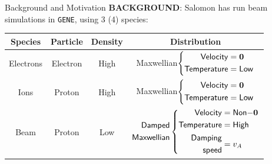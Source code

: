     \begin{frame}{Background and Motivation}
        \vspace{0.5mm}
        {\bf BACKGROUND}: Salomon has run beam simulations in {\tt GENE}, using 3 (4) species:
        \vspace{0.5mm}
        {\footnotesize \begin{center}\begin{tabular}{ c || c | c | c }
            Species  &  Particle  &  Density  &  Distribution  \\
            \hline\hline
            Electrons  &  Electron  &  High  &  Maxwellian$\left\{\begin{aligned}  {\sf Velocity}  &=  \mathbf{0} 
    \\  {\sf Temperature}  &=  {\sf Low}  \end{aligned}\right.$  \\
            \hline
            Ions  &  Proton  &  High  &  Maxwellian$\left\{\begin{aligned}  {\sf Velocity}  &=  \mathbf{0} 
    \\  {\sf Temperature}  &=  {\sf Low}  \end{aligned}\right.$  \\
            \hline
            Beam  &  Proton  &  Low  &  {\color{red!90} $\begin{aligned} 
     {\sf Damped}  \\  {\sf Maxwellian}  \end{aligned}\left\{\begin{aligned}  {\sf Velocity}  &=  {\sf Non-}\mathbf{0} 
        \\  {\sf Temperature}  &=  {\sf High}  \\  \begin{aligned} 
     {\sf Damping}  \\  {\sf speed}  \end{aligned}  &=  v_{A}  \end{aligned}\right.$}
        \end{tabular}\end{center}}
    \end{frame}


